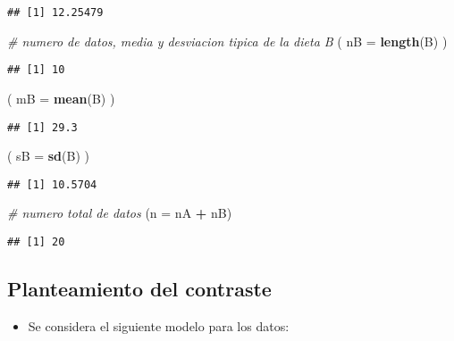 \documentclass[]{article}
\newenvironment{Shaded}{\begin{snugshade}}{\end{snugshade}}
\newcommand{\KeywordTok}[1]{\textcolor[rgb]{0.13,0.29,0.53}{\textbf{#1}}}
\newcommand{\DataTypeTok}[1]{\textcolor[rgb]{0.13,0.29,0.53}{#1}}
\newcommand{\StringTok}[1]{\textcolor[rgb]{0.31,0.60,0.02}{#1}}
\newcommand{\CommentTok}[1]{\textcolor[rgb]{0.56,0.35,0.01}{\textit{#1}}}
\newcommand{\OperatorTok}[1]{\textcolor[rgb]{0.81,0.36,0.00}{\textbf{#1}}}
\newcommand{\NormalTok}[1]{#1}
\providecommand{\tightlist}{%
  \setlength{\itemsep}{0pt}\setlength{\parskip}{0pt}}
\begin{document}
\begin{verbatim}
## [1] 12.25479
\end{verbatim}

\begin{Shaded}
\begin{Highlighting}[]
\CommentTok{# numero de datos, media y desviacion tipica de la dieta B}
\NormalTok{( }\DataTypeTok{nB =} \KeywordTok{length}\NormalTok{(B) )}
\end{Highlighting}
\end{Shaded}

\begin{verbatim}
## [1] 10
\end{verbatim}

\begin{Shaded}
\begin{Highlighting}[]
\NormalTok{( }\DataTypeTok{mB =} \KeywordTok{mean}\NormalTok{(B) )}
\end{Highlighting}
\end{Shaded}

\begin{verbatim}
## [1] 29.3
\end{verbatim}

\begin{Shaded}
\begin{Highlighting}[]
\NormalTok{( }\DataTypeTok{sB =} \KeywordTok{sd}\NormalTok{(B) )}
\end{Highlighting}
\end{Shaded}

\begin{verbatim}
## [1] 10.5704
\end{verbatim}

\begin{Shaded}
\begin{Highlighting}[]
\CommentTok{# numero total de datos}
\NormalTok{(}\DataTypeTok{n =}\NormalTok{ nA }\OperatorTok{+}\StringTok{ }\NormalTok{nB)}
\end{Highlighting}
\end{Shaded}

\begin{verbatim}
## [1] 20
\end{verbatim}

\subsection{Planteamiento del
contraste}\label{planteamiento-del-contraste}

\begin{itemize}
\tightlist
\item
  Se considera el siguiente modelo para los datos:
\end{itemize}
\end{document}
